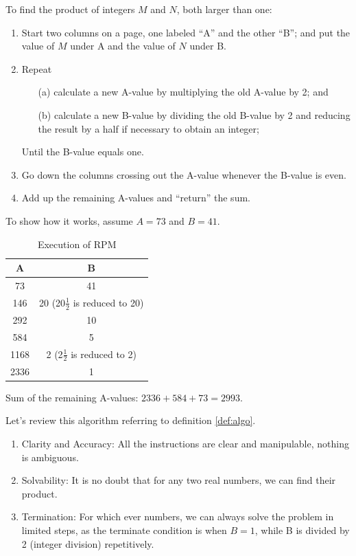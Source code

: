 \documentclass[
	12pt, %
	fleqn, %
	a4paper, %
]{LegrandOrangeBook}
\begin{document}
    \begin{example}
        To find the product of integers \( M \) and \( N \), both larger than one:

        \begin{enumerate}
            \item Start two columns on a page, one labeled ``A'' and the other ``B''; and put the value of \( M \) under A and the value of \( N \) under B.
            
            \item Repeat
            \begin{itemize}
                \item[(a)] calculate a new A-value by multiplying the old A-value by 2; and
                \item[(b)] calculate a new B-value by dividing the old B-value by 2 and reducing the result by a half if necessary to obtain an integer;
            \end{itemize}
            Until the B-value equals one.
            
            \item Go down the columns crossing out the A-value whenever the B-value is even.
            
            \item Add up the remaining A-values and ``return'' the sum.
        \end{enumerate}
    \end{example}
    To show how it works, assume $A=73$ and $B=41$.

\begin{table}[H]
\centering
\begin{tabular}{c|c}
\hline
A & B \\
\hline
73 & 41 \\
146 & 20 (20\(\frac{1}{2}\) is reduced to 20) \\
292 & 10 \\
584 & 5 \\
1168 & 2 (2\(\frac{1}{2}\) is reduced to 2) \\
2336 & 1 \\
\hline
\end{tabular}
\caption{Execution of RPM}
\end{table}

Sum of the remaining A-values: $2336+584+73=2993$.

Let's review this algorithm referring to definition \autoref{def:algo}. 
\begin{enumerate}
    \item Clarity and Accuracy: All the instructions are clear and manipulable, nothing is ambiguous.
    
    \item Solvability: It is no doubt that for any two real numbers, we can find their product.
    
    \item Termination: For which ever numbers, we can always solve the problem in limited steps, as the terminate condition is when $B=1$, while B is divided by 2 (integer division) repetitively. 
\end{enumerate}
\end{document}
